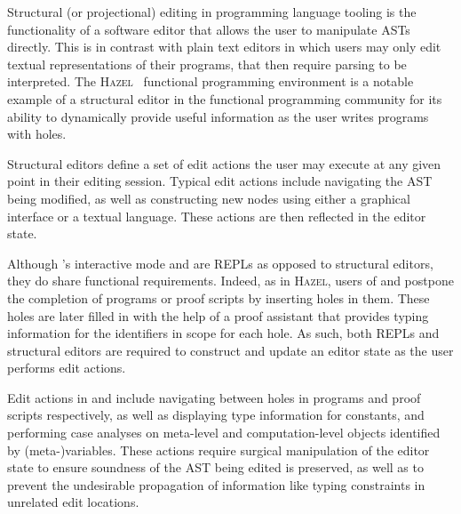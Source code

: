 Structural (or projectional) editing in programming language tooling is the functionality of a software editor that allows the user to manipulate \acp{AST} directly.
This is in contrast with plain text editors in which users may only edit textual representations of their programs, that then require parsing to be interpreted.
The \textsc{Hazel}~\cite{omar2017hazelnut, omar2019live} functional programming environment is a notable example of a structural editor in the functional programming community for its ability to dynamically provide useful information as the user writes programs with holes.

Structural editors define a set of edit actions the user may execute at any given point in their editing session.
Typical edit actions include navigating the \ac{AST} being modified, as well as constructing new nodes using either a graphical interface or a textual language.
These actions are then reflected in the editor state.

Although \Beluga's interactive mode and \Harpoon are \acp{REPL} as opposed to structural editors, they do share functional requirements.
Indeed, as in \textsc{Hazel}, users of \Beluga and \Harpoon postpone the completion of programs or proof scripts by inserting holes in them.
These holes are later filled in with the help of a proof assistant that provides typing information for the identifiers in scope for each hole.
As such, both \acp{REPL} and structural editors are required to construct and update an editor state as the user performs edit actions.

Edit actions in \Beluga and \Harpoon include navigating between holes in programs and proof scripts respectively, as well as displaying type information for constants, and performing case analyses on meta-level and computation-level objects identified by (meta-)variables.
These actions require surgical manipulation of the editor state to ensure soundness of the \ac{AST} being edited is preserved, as well as to prevent the undesirable propagation of information like typing constraints in unrelated edit locations.

